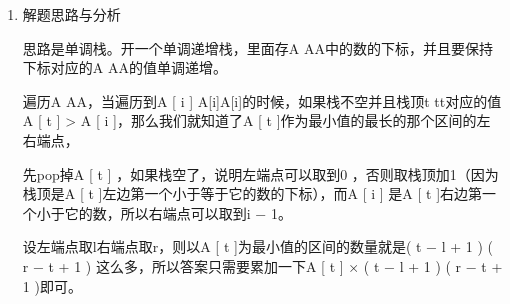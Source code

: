 \documentclass[9pt, b5paaper]{book}
\begin{document}
\begin{enumerate}
\item 解题思路与分析
\label{sec-1-4-45-1}

思路是单调栈。开一个单调递增栈，里面存A AA中的数的下标，并且要保持下标对应的A AA的值单调递增。

遍历A AA，当遍历到A [ i ] A[i]A[i]的时候，如果栈不空并且栈顶t tt对应的值A [ t ] > A [ i ]，那么我们就知道了A [ t ]作为最小值的最长的那个区间的左右端点，

先pop掉A [ t ] ，如果栈空了，说明左端点可以取到0 ，否则取栈顶加1（因为栈顶是A [ t ]左边第一个小于等于它的数的下标），而A [ i ] 是A [ t ]右边第一个小于它的数，所以右端点可以取到i − 1。

设左端点取l右端点取r，则以A [ t ]为最小值的区间的数量就是( t − l + 1 ) ( r − t + 1 ) 这么多，所以答案只需要累加一下A [ t ] × ( t − l + 1 ) ( r − t + 1 )即可。


\end{enumerate}
\end{document}

